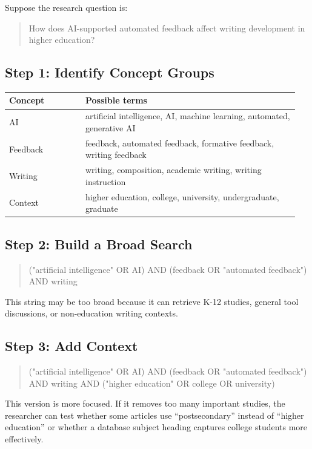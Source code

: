 \documentclass[11pt,letterpaper]{article}
\newcommand{\searchstring}[1]{
  \begin{quote}
  \small\ttfamily\raggedright #1\par
  \end{quote}
}
\begin{document}
Suppose the research question is:

\begin{quote}
How does AI-supported automated feedback affect writing development in higher education?
\end{quote}

\subsection{Step 1: Identify Concept Groups}

\begin{longtable}{@{}p{0.25\linewidth}p{0.70\linewidth}@{}}
\toprule
\textbf{Concept} & \textbf{Possible terms}\\
\midrule
AI & artificial intelligence, AI, machine learning, automated, generative AI\\
Feedback & feedback, automated feedback, formative feedback, writing feedback\\
Writing & writing, composition, academic writing, writing instruction\\
Context & higher education, college, university, undergraduate, graduate\\
\bottomrule
\end{longtable}

\subsection{Step 2: Build a Broad Search}

\searchstring{("artificial intelligence" OR AI) AND (feedback OR "automated feedback") AND writing}

This string may be too broad because it can retrieve K-12 studies, general tool discussions, or non-education writing contexts.

\subsection{Step 3: Add Context}

\searchstring{("artificial intelligence" OR AI) AND (feedback OR "automated feedback") AND writing AND ("higher education" OR college OR university)}

This version is more focused. If it removes too many important studies, the researcher can test whether some articles use ``postsecondary'' instead of ``higher education'' or whether a database subject heading captures college students more effectively.
\end{document}
